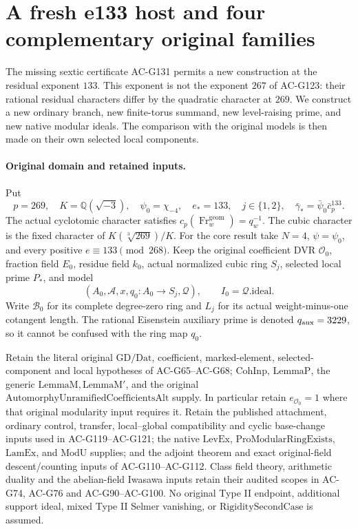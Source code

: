 \section{A fresh e133 host and four complementary original families}
\label{sec:cubic-e133-actual-model}

The missing sextic certificate AC-G131 permits a new construction at
the residual exponent \(133\).  This exponent is not the exponent
\(267\) of AC-G123: their rational residual characters differ by the
quadratic character at \(269\).  We construct a new ordinary branch,
new finite-torus summand, new level-raising prime, and new native
modular ideals.  The comparison with the original models is then
made on their own selected local components.

\paragraph{Original domain and retained inputs.}
Put
\[
 p=269,\quad K=\mathbb Q(\sqrt{-3}),\quad
 \psi_0=\chi_{-4},\quad e_*=133,\quad j\in\{1,2\},
 \quad \bar\gamma_*=\bar\psi_0\bar c_p^{133}.
 \tag{G132.1}
\]
The actual cyclotomic character satisfies
\(c_p(\operatorname{Fr}^{\mathrm{geom}}_w)=q_w^{-1}\).
The cubic character is the fixed character of
\(K(\sqrt[3]{269})/K\).
For the core result take \(N=4\), \(\psi=\psi_0\), and every
positive \(e\equiv133\pmod{268}\).  Keep the original coefficient
DVR \(\mathcal O_0\), fraction field \(E_0\), residue field \(k_0\),
actual normalized cubic ring \(S_j\), selected local prime \(P_*\),
and model
\[
 (A_0,\mathcal A,x,q_0:A_0\longrightarrow S_j,\mathcal Q),
 \qquad I_0=\mathcal Q.\mathrm{ideal}.
 \tag{G132.2}
\]
Write \(\mathscr B_0\) for its complete degree-zero ring and \(L_j\)
for its actual weight-minus-one cotangent length.  The rational
Eisenstein auxiliary prime is denoted \(q_{\rm aux}=3229\), so it
cannot be confused with the ring map \(q_0\).

Retain the literal original \(\mathrm{GD}/\mathrm{Dat}\), coefficient,
marked-element, selected-component and local hypotheses of
AC-G65--AC-G68; \(\mathrm{CohInp}\), \(\mathrm{LemmaP}\), the generic
\(\mathrm{LemmaM},\mathrm{LemmaM'}\), and the original
\(\mathrm{AutomorphyUnramifiedCoefficientsAlt}\) supply.
In particular retain \(e_{\mathcal O_0}=1\) where that original
modularity input requires it.  Retain the published attachment,
ordinary control, transfer, local--global compatibility and cyclic
base-change inputs used in AC-G119--AC-G121; the native
\(\mathrm{LevEx}\), \(\mathrm{ProModularRingExists}\),
\(\mathrm{LamEx}\), and \(\mathrm{ModU}\) supplies; and the adjoint
theorem and exact original-field descent/counting inputs of
AC-G110--AC-G112.  Class field theory, arithmetic duality and the
abelian-field Iwasawa inputs retain their audited scopes in
AC-G74, AC-G76 and AC-G90--AC-G100.
No original Type II endpoint, additional support ideal, mixed
Type II Selmer vanishing, or \(\mathrm{RigiditySecondCase}\) is assumed.

